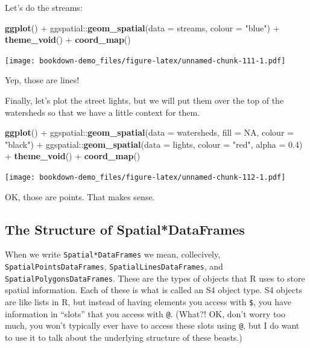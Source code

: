 \documentclass[]{book}
\newenvironment{Shaded}{\begin{snugshade}}{\end{snugshade}}
\newcommand{\KeywordTok}[1]{\textcolor[rgb]{0.13,0.29,0.53}{\textbf{{#1}}}}
\newcommand{\DataTypeTok}[1]{\textcolor[rgb]{0.13,0.29,0.53}{{#1}}}
\newcommand{\FloatTok}[1]{\textcolor[rgb]{0.00,0.00,0.81}{{#1}}}
\newcommand{\StringTok}[1]{\textcolor[rgb]{0.31,0.60,0.02}{{#1}}}
\newcommand{\OtherTok}[1]{\textcolor[rgb]{0.56,0.35,0.01}{{#1}}}
\newcommand{\NormalTok}[1]{{#1}}
\theoremstyle{definition}
\theoremstyle{definition}
\theoremstyle{remark}
\begin{document}
Let's do the streams:

\begin{Shaded}
\begin{Highlighting}[]
\KeywordTok{ggplot}\NormalTok{() +}
\StringTok{  }\NormalTok{ggspatial::}\KeywordTok{geom_spatial}\NormalTok{(}\DataTypeTok{data =} \NormalTok{streams, }\DataTypeTok{colour =} \StringTok{"blue"}\NormalTok{) +}
\StringTok{  }\KeywordTok{theme_void}\NormalTok{() +}
\StringTok{  }\KeywordTok{coord_map}\NormalTok{()}
\end{Highlighting}
\end{Shaded}

\texttt{[image: bookdown-demo\_files/figure-latex/unnamed-chunk-111-1.pdf]}

Yep, those are lines!

Finally, let's plot the street lights, but we will put them over the top
of the watersheds so that we have a little context for them.

\begin{Shaded}
\begin{Highlighting}[]
\KeywordTok{ggplot}\NormalTok{() +}
\StringTok{  }\NormalTok{ggspatial::}\KeywordTok{geom_spatial}\NormalTok{(}\DataTypeTok{data =} \NormalTok{watersheds, }\DataTypeTok{fill =} \OtherTok{NA}\NormalTok{, }\DataTypeTok{colour =} \StringTok{"black"}\NormalTok{) +}
\StringTok{  }\NormalTok{ggspatial::}\KeywordTok{geom_spatial}\NormalTok{(}\DataTypeTok{data =} \NormalTok{lights, }\DataTypeTok{colour =} \StringTok{"red"}\NormalTok{, }\DataTypeTok{alpha =} \FloatTok{0.4}\NormalTok{) +}
\StringTok{  }\KeywordTok{theme_void}\NormalTok{() +}
\StringTok{  }\KeywordTok{coord_map}\NormalTok{()}
\end{Highlighting}
\end{Shaded}

\texttt{[image: bookdown-demo\_files/figure-latex/unnamed-chunk-112-1.pdf]}

OK, those are points. That makes sense.

\subsection{The Structure of
Spatial*DataFrames}\label{the-structure-of-spatialdataframes}

When we write \texttt{Spatial*DataFrames} we mean, collecively,
\texttt{SpatialPointsDataFrames}, \texttt{SpatialLinesDataFrames}, and
\texttt{SpatialPolygonsDataFrames}. These are the types of objects that
R uses to store spatial information. Each of these is what is called an
S4 object type. S4 objects are like lists in R, but instead of having
elements you access with \texttt{\$}, you have information in ``slots''
that you access with \texttt{@}. (What?! OK, don't worry too much, you
won't typically ever have to access these slots using \texttt{@}, but I
do want to use it to talk about the underlying structure of these
beasts.)
\end{document}
